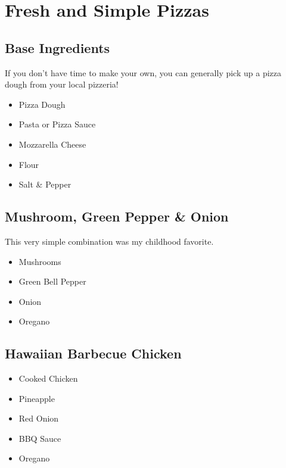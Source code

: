\thispagestyle{fancy}
\section{Fresh and Simple Pizzas}
\AddToShipoutPicture*{\Pizza}

\subsection*{Base Ingredients}
If you don't have time to make your own, you can generally pick up a pizza dough from your local pizzeria!
\begin{multicols}{3}
	\begin{itemize}
		\item Pizza Dough
		\item Pasta or Pizza Sauce
		\item Mozzarella Cheese
		\item Flour
		\item Salt \& Pepper
	\end{itemize}
\end{multicols}

\subsection*{Mushroom, Green Pepper \& Onion}
This very simple combination was my childhood favorite. 
\begin{multicols}{3}
	\begin{itemize}
		\item Mushrooms
		\item Green Bell Pepper
		\item Onion
		\item Oregano
	\end{itemize}
\end{multicols}

\subsection*{Hawaiian Barbecue Chicken}
\begin{multicols}{3}
	\begin{itemize}
		\item Cooked Chicken 
		\item Pineapple
		\item Red Onion
		\item BBQ Sauce
		\item Oregano
	\end{itemize}
\end{multicols}

